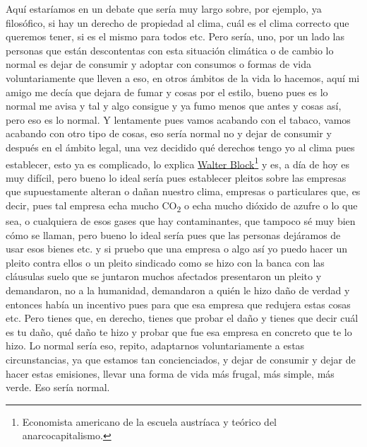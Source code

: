 Aquí estaríamos en un debate que sería muy largo sobre, por ejemplo, ya filosófico, si hay un derecho de propiedad al clima, cuál es el clima correcto que queremos tener, si es el mismo para todos etc. Pero sería, uno, por un lado las personas que están descontentas con esta situación climática o de cambio lo normal es dejar de consumir y adoptar con consumos o formas de vida voluntariamente que lleven a eso, en otros ámbitos de la vida lo hacemos, aquí mi amigo me decía que dejara de fumar y cosas por el estilo, bueno pues es lo normal me avisa y tal y algo consigue y ya fumo menos que antes y cosas así, pero eso es lo normal. Y lentamente pues vamos acabando con el tabaco, vamos acabando con otro tipo de cosas, eso sería normal no y dejar de consumir y después en el ámbito legal, una vez decidido qué derechos tengo yo al clima pues establecer, esto ya es complicado, lo explica \href{https://en.wikipedia.org/wiki/Walter_Block}{Walter Block}\footnote{Economista americano de la escuela austríaca y teórico del anarcocapitalismo.} y es, a día de hoy es muy difícil, pero bueno lo ideal sería pues establecer pleitos sobre las empresas que supuestamente alteran o dañan nuestro clima, empresas o particulares que, es decir, pues tal empresa echa mucho CO\textsubscript{2} o echa mucho dióxido de azufre o lo que sea, o cualquiera de esos gases que hay contaminantes, que tampoco sé muy bien cómo se llaman, pero bueno lo ideal sería pues que las personas dejáramos de usar esos bienes etc. y si pruebo que una empresa o algo así yo puedo hacer un pleito contra ellos o un pleito sindicado como se hizo con la banca con las cláusulas suelo que se juntaron muchos afectados presentaron un pleito y demandaron, no a la humanidad, demandaron a quién le hizo daño de verdad y entonces había un incentivo pues para que esa empresa que redujera estas cosas etc. Pero tienes que, en derecho, tienes que probar el daño y tienes que decir cuál es tu daño, qué daño te hizo y probar que fue esa empresa en concreto que te lo hizo. Lo normal sería eso, repito, adaptarnos voluntariamente a estas circunstancias, ya que estamos tan concienciados, y dejar de consumir y dejar de hacer estas emisiones, llevar una forma de vida más frugal, más simple, más verde. Eso sería normal.

